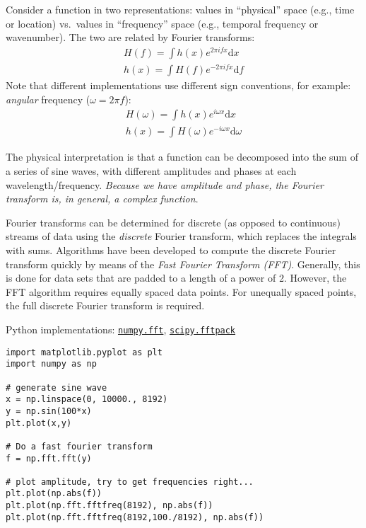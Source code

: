 \documentclass{article}
\begin{document}
Consider a function in two representations: values in
``physical'' space (e.g., time or location) vs.\ values in ``frequency'' space
(e.g., temporal frequency or wavenumber). The two are related by Fourier
transforms:
\begin{align*}
    H(f) = \int{\! h(x)e^{  2\pi{ifx} } \textrm{d}x}\\
    h(x) = \int{\! H(f)e^{ -2\pi{ifx} } \textrm{d}f}
\end{align*}
Note that different implementations use different sign conventions,
for example: \emph{angular} frequency ($\omega = 2\pi f$):
\begin{align*}
    H(\omega) = \int{\! h(x)e^{  i\omega{x} } \textrm{d}x}\\
    h(x) = \int{\! H(\omega)e^{ -i\omega{x} } \textrm{d}\omega}
\end{align*}

The physical interpretation is that a function can be decomposed into the sum
of a series of sine waves, with different amplitudes and phases at each
wavelength/frequency. \emph{Because we have amplitude and phase, the Fourier
transform is, in general, a complex function}.

Fourier transforms can be determined for discrete (as opposed to
continuous) streams of data using the \textit{discrete} Fourier transform,
which replaces the integrals with sums. Algorithms have been developed to
compute the discrete Fourier transform quickly by means of the \textit{Fast
Fourier Transform (FFT)}. Generally, this is done for data sets that are
padded to a length of a power of 2. However, the FFT algorithm requires
equally spaced data points. For unequally spaced points, the full discrete
Fourier transform is required.

Python implementations:
\href{http://docs.scipy.org/doc/numpy/reference/routines.fft.html}
\texttt{numpy.fft},
\href{http://docs.scipy.org/doc/scipy/reference/tutorial/fftpack.html}
\texttt{scipy.fftpack}

\begin{lstlisting}
import matplotlib.pyplot as plt
import numpy as np

# generate sine wave
x = np.linspace(0, 10000., 8192)
y = np.sin(100*x)
plt.plot(x,y)

# Do a fast fourier transform
f = np.fft.fft(y)

# plot amplitude, try to get frequencies right...
plt.plot(np.abs(f))
plt.plot(np.fft.fftfreq(8192), np.abs(f))
plt.plot(np.fft.fftfreq(8192,100./8192), np.abs(f))
\end{lstlisting}
\end{document}
